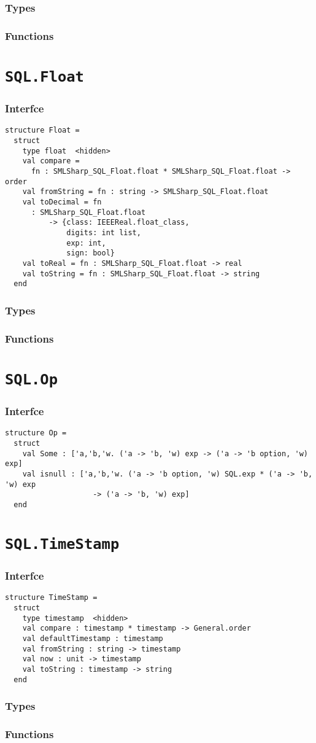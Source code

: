 \documentclass{jbook}
\makeatletter
\newcommand{\txt}[2]{#2}
\newcommand{\code}[1]{\mbox{\large\tt #1}}
\newcommand{\structure}[1]{
\section{{\tt #1}}\label{section:reference:#1}
}
\newcommand{\DECL}[2]{
 \medskip\noindent
 {\tt #1\begin{tabular}[t]{@{}l@{}l}#2\end{tabular}\par}
}
\newcommand{\type}[2]{\DECL{type~#1~=~}{#2}}
\newcommand{\val}[2]{\code{val~#1~:~#2}\par}
\newcommand{\Types}{\subsubsection*{\txt{型}{Types}}}
\newcommand{\Interface}{\subsubsection*{\txt{インタフェイス}{Interfce}}}
\newcommand{\Functions}{\subsubsection*{\txt{関数}{Functions}}}
\makeatother
\begin{document}
\Types


\Functions


\structure{SQL.Float}
\Interface
\begin{verbatim}
structure Float =
  struct
    type float  <hidden>
    val compare =
      fn : SMLSharp_SQL_Float.float * SMLSharp_SQL_Float.float -> order
    val fromString = fn : string -> SMLSharp_SQL_Float.float
    val toDecimal = fn
      : SMLSharp_SQL_Float.float
          -> {class: IEEEReal.float_class,
              digits: int list,
              exp: int,
              sign: bool}
    val toReal = fn : SMLSharp_SQL_Float.float -> real
    val toString = fn : SMLSharp_SQL_Float.float -> string
  end
\end{verbatim}

\Types


\Functions


\structure{SQL.Op}
\Interface
\begin{verbatim}
structure Op =
  struct
    val Some : ['a,'b,'w. ('a -> 'b, 'w) exp -> ('a -> 'b option, 'w) exp]
    val isnull : ['a,'b,'w. ('a -> 'b option, 'w) SQL.exp * ('a -> 'b, 'w) exp
                    -> ('a -> 'b, 'w) exp]
  end
\end{verbatim}


\structure{SQL.TimeStamp}
\Interface
\begin{verbatim}
structure TimeStamp =
  struct
    type timestamp  <hidden>
    val compare : timestamp * timestamp -> General.order
    val defaultTimestamp : timestamp
    val fromString : string -> timestamp
    val now : unit -> timestamp
    val toString : timestamp -> string
  end
\end{verbatim}
\Types


\Functions

\end{document}
